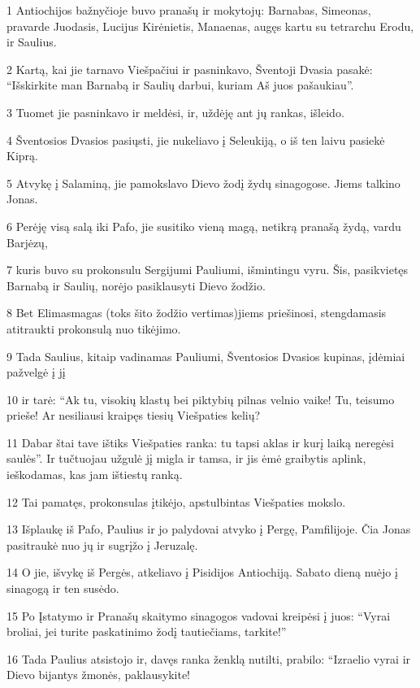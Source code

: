 \par 1 Antiochijos bažnyčioje buvo pranašų ir mokytojų: Barnabas, Simeonas, pravarde Juodasis, Lucijus Kirėnietis, Manaenas, augęs kartu su tetrarchu Erodu, ir Saulius. 
\par 2 Kartą, kai jie tarnavo Viešpačiui ir pasninkavo, Šventoji Dvasia pasakė: “Išskirkite man Barnabą ir Saulių darbui, kuriam Aš juos pašaukiau”. 
\par 3 Tuomet jie pasninkavo ir meldėsi, ir, uždėję ant jų rankas, išleido. 
\par 4 Šventosios Dvasios pasiųsti, jie nukeliavo į Seleukiją, o iš ten laivu pasiekė Kiprą. 
\par 5 Atvykę į Salaminą, jie pamokslavo Dievo žodį žydų sinagogose. Jiems talkino Jonas. 
\par 6 Perėję visą salą iki Pafo, jie susitiko vieną magą, netikrą pranašą žydą, vardu Barjėzų, 
\par 7 kuris buvo su prokonsulu Sergijumi Pauliumi, išmintingu vyru. Šis, pasikvietęs Barnabą ir Saulių, norėjo pasiklausyti Dievo žodžio. 
\par 8 Bet Elimas­magas (toks šito žodžio vertimas)­jiems priešinosi, stengdamasis atitraukti prokonsulą nuo tikėjimo. 
\par 9 Tada Saulius, kitaip vadinamas Pauliumi, Šventosios Dvasios kupinas, įdėmiai pažvelgė į jį 
\par 10 ir tarė: “Ak tu, visokių klastų bei piktybių pilnas velnio vaike! Tu, teisumo prieše! Ar nesiliausi kraipęs tiesių Viešpaties kelių? 
\par 11 Dabar štai tave ištiks Viešpaties ranka: tu tapsi aklas ir kurį laiką neregėsi saulės”. Ir tučtuojau užgulė jį migla ir tamsa, ir jis ėmė graibytis aplink, ieškodamas, kas jam ištiestų ranką. 
\par 12 Tai pamatęs, prokonsulas įtikėjo, apstulbintas Viešpaties mokslo. 
\par 13 Išplaukę iš Pafo, Paulius ir jo palydovai atvyko į Pergę, Pamfilijoje. Čia Jonas pasitraukė nuo jų ir sugrįžo į Jeruzalę. 
\par 14 O jie, išvykę iš Pergės, atkeliavo į Pisidijos Antiochiją. Sabato dieną nuėjo į sinagogą ir ten susėdo. 
\par 15 Po Įstatymo ir Pranašų skaitymo sinagogos vadovai kreipėsi į juos: “Vyrai broliai, jei turite paskatinimo žodį tautiečiams, tarkite!” 
\par 16 Tada Paulius atsistojo ir, davęs ranka ženklą nutilti, prabilo: “Izraelio vyrai ir Dievo bijantys žmonės, paklausykite! 

